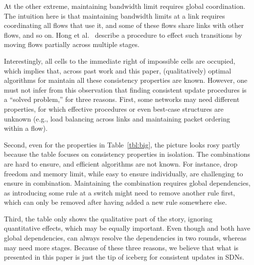 At the other extreme, maintaining bandwidth limit requires global coordination. The intuition here is that maintaining bandwidth limits at a link requires coordinating all flows that use it, and some of these flows share links with other flows, and so on. Hong et al.~\cite{swan} describe a procedure to effect such transitions by moving flows partially across multiple stages.

Interestingly, all cells to the immediate right of impossible cells are occupied, which implies that, across past work and this paper,  (qualitatively) optimal algorithms for maintain all these consistency properties are known. However, one must not infer from this observation that finding consistent update procedures is a ``solved problem,'' for three reasons. First, some networks may need different properties, for which effective procedures or even best-case structures are unknown (e.g., load balancing across links and maintaining packet ordering within a flow).

Second, even for the properties in Table~\ref{tbl:big}, the picture looks rosy partly because the table focuses on consistency properties in isolation. The combinations are hard to  ensure, and efficient algorithms are not known. For instance, drop freedom and memory limit, while easy to ensure individually, are challenging to ensure in combination. Maintaining the combination requires global dependencies, as introducing some rule at a switch might need to remove another rule first, which can only be removed after having added a new rule somewhere else.

Third, the table only shows the qualitative part of the story, ignoring quantitative effects, which may be equally important. Even though \cite{safeupdate} and \cite{swan} both have global dependencies, \cite{safeupdate} can always resolve the dependencies in two rounds, whereas \cite{swan} may need more stages. Because of these three reasons, we believe that what is presented in this paper is just the tip of iceberg for consistent updates in SDNs.
